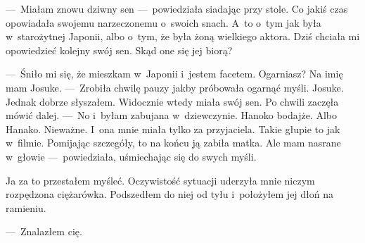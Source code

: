 ---~Miałam znowu dziwny sen ---~powiedziała siadając przy stole. Co jakiś czas opowiadała swojemu narzeczonemu o~swoich snach. A~to o~tym jak była w~starożytnej Japonii, albo o~tym, że była żoną wielkiego aktora. Dziś chciała mi opowiedzieć kolejny swój sen. Skąd one się jej biorą? 

---~Śniło mi się, że mieszkam w~Japonii i~jestem facetem. Ogarniasz? Na imię mam Josuke. ---~Zrobiła chwilę pauzy jakby próbowała ogarnąć myśli. Josuke. Jednak dobrze słyszałem. Widocznie wtedy miała swój sen. Po chwili zaczęła mówić dalej. ---~No i~byłam zabujana w~dziewczynie. Hanoko bodajże. Albo Hanako. Nieważne. I~ona mnie miała tylko za przyjaciela. Takie głupie to jak w~filmie. Pomijając szczegóły, to na końcu ją zabiła matka. Ale mam nasrane w~głowie ---~powiedziała, uśmiechając się do swych myśli.

Ja za to przestałem myśleć. Oczywistość sytuacji uderzyła mnie niczym rozpędzona ciężarówka. Podszedłem do niej od tyłu i~położyłem jej dłoń na ramieniu.

---~Znalazłem cię.
